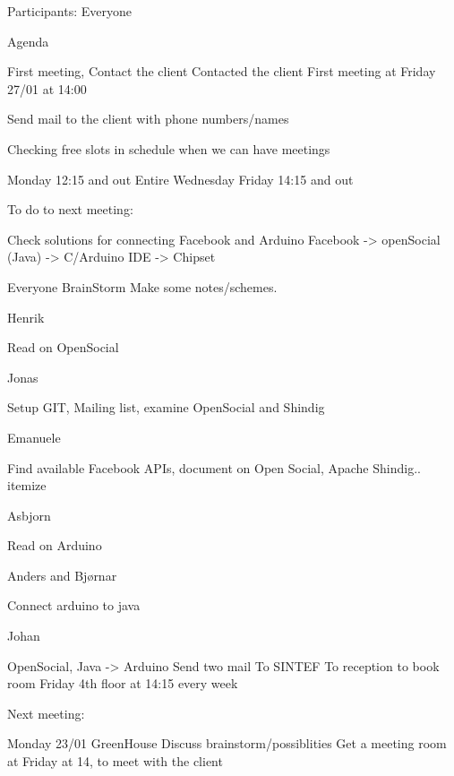 Participants: Everyone

Agenda


First meeting, 
Contact the client
Contacted the client
First meeting at Friday 27/01 at 14:00


Send mail to the client with phone numbers/names

Checking free slots in schedule when we can have meetings

Monday 12:15 and out
Entire Wednesday
Friday 14:15 and out


To do to next meeting:

Check solutions for connecting Facebook and Arduino
Facebook -> openSocial (Java) -> C/Arduino IDE -> Chipset


Everyone
BrainStorm
Make some notes/schemes.

Henrik

Read on OpenSocial

Jonas

Setup GIT, Mailing list, examine OpenSocial and Shindig


Emanuele

Find available Facebook APIs, document on Open Social, Apache Shindig..
itemize

Asbjorn

Read on Arduino


Anders and Bjørnar

Connect arduino to java


Johan

OpenSocial, Java -> Arduino
Send two mail
To SINTEF
To reception to book room Friday 4th floor at 14:15 every week


Next meeting:

Monday 23/01 GreenHouse
Discuss brainstorm/possiblities
Get a meeting room at Friday at 14, to meet with the client